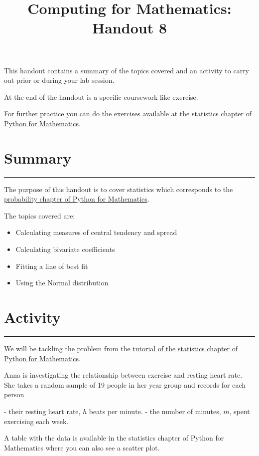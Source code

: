 \documentclass{article}
\title{Computing for Mathematics: Handout 8}
\date{}
\begin{document}
\maketitle


This handout contains a summary of the topics covered and an activity to
carry out prior or during your lab session.

At the end of the handout is a specific coursework like exercise.

For further practice you can do the exercises available at 
\href{https://vknight.org/pfm/tools-for-mathematics/08-statistics/introduction/main.html}{the
statistics chapter of Python for Mathematics}.

\section{Summary}\label{summary}
\hrule


The purpose of this handout is to cover statistics which
corresponds to the
\href{https://vknight.org/pfm/tools-for-mathematics/08-statistics/introduction/main.html}{probability
chapter of Python for Mathematics}.

The topics covered are:

\begin{itemize}
    \item Calculating measures of central tendency and spread
    \item Calculating bivariate coefficients
    \item Fitting a line of best fit
    \item Using the Normal distribution
\end{itemize}
\section{Activity}\label{activity}
\hrule

We will be tackling the problem from the
\href{https://vknight.org/pfm/tools-for-mathematics/08-statistics/tutorial/main.html}{tutorial
of the statistics chapter of Python for Mathematics}.

Anna is investigating the relationship between exercise and resting heart rate.
She takes a random sample of 19 people in her year group and records for each person

- their resting heart rate, $h$ beats per minute.
- the number of minutes, $m$, spent exercising each week.

A table with the data is available in the statistics chapter of Python for
Mathematics where you can also see a scatter plot.
\end{document}
